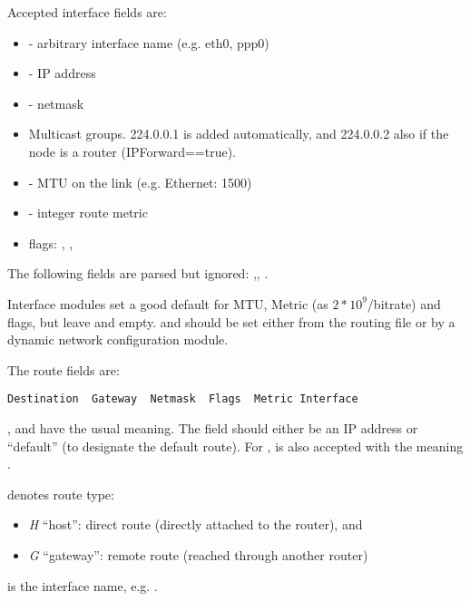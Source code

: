 Accepted interface fields are:

\begin{itemize}
  \item {} - arbitrary interface name (e.g. eth0, ppp0)
  \item {} - IP address
  \item {} - netmask
  \item {} Multicast groups. 224.0.0.1 is added automatically,
     and 224.0.0.2 also if the node is a router (IPForward==true).
  \item {} - MTU on the link (e.g. Ethernet: 1500)
  \item {} - integer route metric
  \item flags: , , 
\end{itemize}

The following fields are parsed but ignored: ,,
.

Interface modules set a good default for MTU, Metric (as $2*10^9$/bitrate) and
flags, but leave  and  empty.  and
 should be set either from the routing file or by a dynamic network
configuration module.

The route fields are:

\begin{verbatim}
Destination  Gateway  Netmask  Flags  Metric Interface
\end{verbatim}

,  and  have the usual meaning.
The  field should either be an IP address or ``default''
(to designate the default route). For , \ttt{*} is also
accepted with the meaning .

 denotes route type:

\begin{itemize}
  \item \textit{H} ``host'': direct route (directly attached to the router), and
  \item \textit{G} ``gateway'': remote route (reached through another router)
\end{itemize}

 is the interface name, e.g. .


